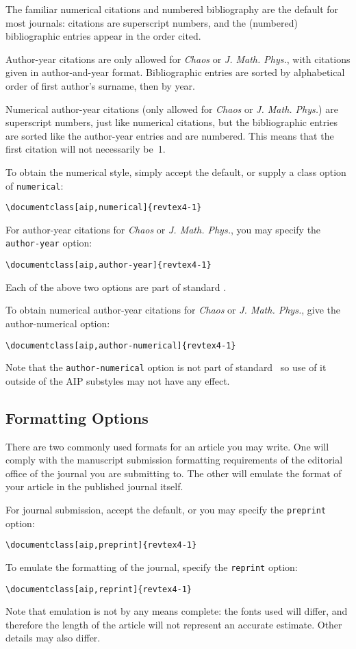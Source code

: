 \documentclass[%
 reprint,%
 amssymb, amsmath,%
 aip,cha,%
]{revtex4-1}
\begin{document}
The familiar numerical citations and numbered bibliography are the default for most journals: 
citations are superscript numbers, and the (numbered) bibliographic entries appear in the order cited. 

Author-year citations are only allowed for 
\textit{Chaos} or \textit{J. Math. Phys.}, with citations given in author-and-year format. 
Bibliographic entries are sorted by alphabetical order of first author's surname, then by year. 

Numerical author-year citations 
(only allowed for \textit{Chaos} or \textit{J. Math. Phys.}) 
are superscript numbers, just like numerical citations, 
but the bibliographic entries are sorted like the author-year entries and are numbered. 
This means that the first citation will not necessarily be~1.

To obtain the numerical style, simply accept the default, or supply a class option of \texttt{numerical}:
\begin{verbatim}
\documentclass[aip,numerical]{revtex4-1}
\end{verbatim}
For author-year citations for \textit{Chaos} or \textit{J. Math. Phys.}, 
you may specify the \texttt{author-year} option:
\begin{verbatim}
\documentclass[aip,author-year]{revtex4-1}
\end{verbatim}
Each of the above two options are part of standard \revtex.

To obtain numerical author-year citations 
for \textit{Chaos} or \textit{J. Math. Phys.}, 
give the author-numerical option:
\begin{verbatim}
\documentclass[aip,author-numerical]{revtex4-1}
\end{verbatim}
Note that the \texttt{author-numerical} option is not part of standard \revtex\, so use of it
outside of the AIP substyles may not have any effect. 

\subsection{Formatting Options}
There are two commonly used formats for an article you may write. 
One will comply with the manuscript submission formatting requirements of the editorial office of the journal you are submitting to.
The other will emulate the format of your article in the published journal itself. 

For journal submission, accept the default, or you may specify the \texttt{preprint} option:
\begin{verbatim}
\documentclass[aip,preprint]{revtex4-1}
\end{verbatim}
To emulate the formatting of the journal, specify the \texttt{reprint} option:
\begin{verbatim}
\documentclass[aip,reprint]{revtex4-1}
\end{verbatim}
Note that emulation is not by any means complete: the fonts used will differ, and therefore
the length of the article will not represent an accurate estimate. 
Other details may also differ. 
\end{document}
